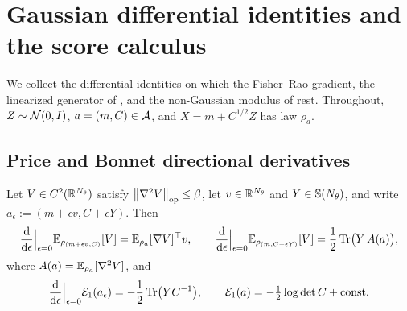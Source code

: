 \section{Gaussian differential identities and the score calculus}
\label{app:identities}

We collect the differential identities on which the Fisher--Rao gradient, the
linearized generator of , and the non-Gaussian modulus of
 rest. Throughout, $Z\sim\mathcal{N}(0,I)$, $a=(m,C)\in\mathcal{A}$, and $X=m+C^{1/2}Z$ has
law $\rho_a$.

\subsection{Price and Bonnet directional derivatives}

\begin{lemma}
\label{lem:price}
Let $V\in C^2(\mathbb{R}^{N_\theta})$ satisfy $\left\lVert \nabla^2V\right\rVert_{\mathrm{op}}\leq\beta$, let $v\in\mathbb{R}^{N_\theta}$
and $Y\in\mathbb{S}(N_\theta)$, and write $a_\epsilon:=(m+\epsilon v,C+\epsilon Y)$. Then
\begin{equation}
\label{eq:price-directional}
    \frac{\mathrm{d}}{\mathrm{d}\epsilon}\Big|_{\epsilon=0}\mathbb{E}_{\rho_{(m+\epsilon v,C)}}[V]
    =\mathbb{E}_{\rho_a}[\nabla V]^\top v,
    \qquad
    \frac{\mathrm{d}}{\mathrm{d}\epsilon}\Big|_{\epsilon=0}\mathbb{E}_{\rho_{(m,C+\epsilon Y)}}[V]
    =\frac12\operatorname{Tr}\bigl(Y\,A(a)\bigr),
\end{equation}
where $A(a)=\mathbb{E}_{\rho_a}[\nabla^2V]$, and
\begin{equation}
\label{eq:entropy-directional}
    \frac{\mathrm{d}}{\mathrm{d}\epsilon}\Big|_{\epsilon=0}\mathcal{E}_1(a_\epsilon)=-\frac12\operatorname{Tr}\bigl(YC^{-1}\bigr),
    \qquad
    \mathcal{E}_1(a)=-\tfrac12\log\det C+\mathrm{const}.
\end{equation}
\end{lemma}

